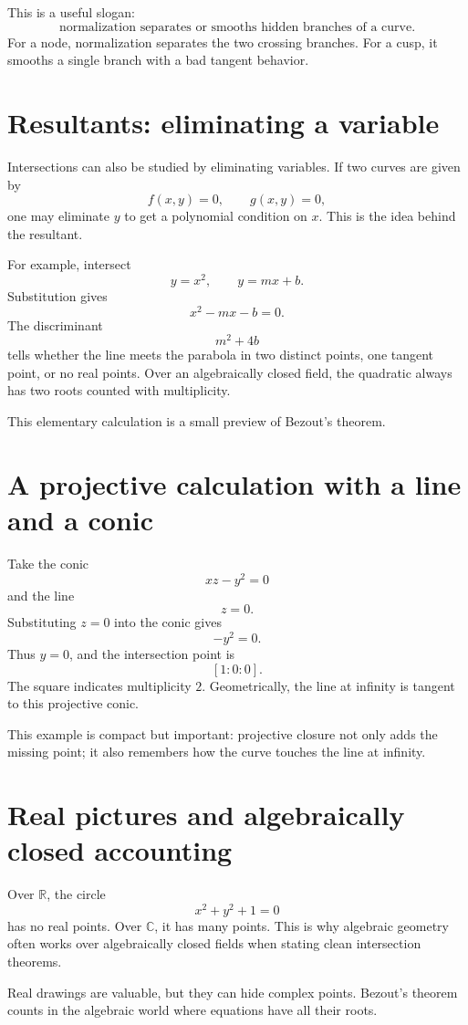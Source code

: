 This is a useful slogan:
\[
  \text{normalization separates or smooths hidden branches of a curve.}
\]
For a node, normalization separates the two crossing branches.  For a cusp, it smooths a single branch with a bad tangent behavior.

\section{Resultants: eliminating a variable}

Intersections can also be studied by eliminating variables.  If two curves are given by
\[
  f(x,y)=0,\qquad g(x,y)=0,
\]
one may eliminate \(y\) to get a polynomial condition on \(x\).  This is the idea behind the resultant.

For example, intersect
\[
  y=x^2,\qquad y=mx+b.
\]
Substitution gives
\[
  x^2-mx-b=0.
\]
The discriminant
\[
  m^2+4b
\]
tells whether the line meets the parabola in two distinct points, one tangent point, or no real points.  Over an algebraically closed field, the quadratic always has two roots counted with multiplicity.

This elementary calculation is a small preview of Bezout's theorem.

\section{A projective calculation with a line and a conic}

Take the conic
\[
  xz-y^2=0
\]
and the line
\[
  z=0.
\]
Substituting \(z=0\) into the conic gives
\[
  -y^2=0.
\]
Thus \(y=0\), and the intersection point is
\[
  [1:0:0].
\]
The square indicates multiplicity \(2\).  Geometrically, the line at infinity is tangent to this projective conic.

This example is compact but important: projective closure not only adds the missing point; it also remembers how the curve touches the line at infinity.

\section{Real pictures and algebraically closed accounting}

Over \(\mathbb R\), the circle
\[
  x^2+y^2+1=0
\]
has no real points.  Over \(\mathbb C\), it has many points.  This is why algebraic geometry often works over algebraically closed fields when stating clean intersection theorems.

Real drawings are valuable, but they can hide complex points.  Bezout's theorem counts in the algebraic world where equations have all their roots.

